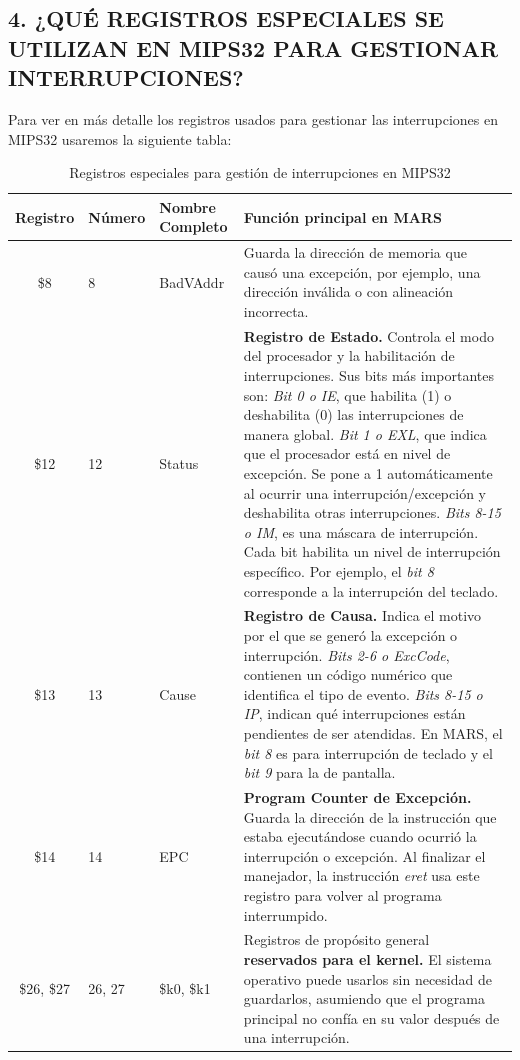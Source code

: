 \documentclass[12pt]{article}
\begin{document}
\subsection*{4. ¿QUÉ REGISTROS ESPECIALES SE UTILIZAN EN MIPS32 PARA GESTIONAR INTERRUPCIONES?}

Para ver en más detalle los registros usados para gestionar las interrupciones en MIPS32 usaremos la siguiente tabla:

\begin{table}[h]
\centering
\begin{tabular}{cllp{9cm}}
\toprule
\textbf{Registro} & \textbf{Número} & \textbf{Nombre Completo} & \textbf{Función principal en MARS} \\
\midrule
\$8 & 8 & BadVAddr & Guarda la dirección de memoria que causó una excepción, por ejemplo, una dirección inválida o con alineación incorrecta. \\
\midrule
\$12 & 12 & Status & \textbf{Registro de Estado.} Controla el modo del procesador y la habilitación de interrupciones. Sus bits más importantes son: \textit{Bit 0 o IE}, que habilita (1) o deshabilita (0) las interrupciones de manera global. \textit{Bit 1 o EXL}, que indica que el procesador está en nivel de excepción. Se pone a 1 automáticamente al ocurrir una interrupción/excepción y deshabilita otras interrupciones. \textit{Bits 8-15 o IM}, es una máscara de interrupción. Cada bit habilita un nivel de interrupción específico. Por ejemplo, el \textit{bit 8} corresponde a la interrupción del teclado. \\
\midrule
\$13 & 13 & Cause & \textbf{Registro de Causa.} Indica el motivo por el que se generó la excepción o interrupción. \textit{Bits 2-6 o ExcCode}, contienen un código numérico que identifica el tipo de evento. \textit{Bits 8-15 o IP}, indican qué interrupciones están pendientes de ser atendidas. En MARS, el \textit{bit 8} es para interrupción de teclado y el \textit{bit 9} para la de pantalla. \\
\midrule
\$14 & 14 & EPC & \textbf{Program Counter de Excepción.} Guarda la dirección de la instrucción que estaba ejecutándose cuando ocurrió la interrupción o excepción. Al finalizar el manejador, la instrucción \textit{eret} usa este registro para volver al programa interrumpido. \\
\midrule
\$26, \$27 & 26, 27 & \$k0, \$k1 & Registros de propósito general \textbf{reservados para el kernel.} El sistema operativo puede usarlos sin necesidad de guardarlos, asumiendo que el programa principal no confía en su valor después de una interrupción. \\
\bottomrule
\end{tabular}
\caption{Registros especiales para gestión de interrupciones en MIPS32}
\label{tab:registros-interrupciones}
\end{table}
\end{document}
